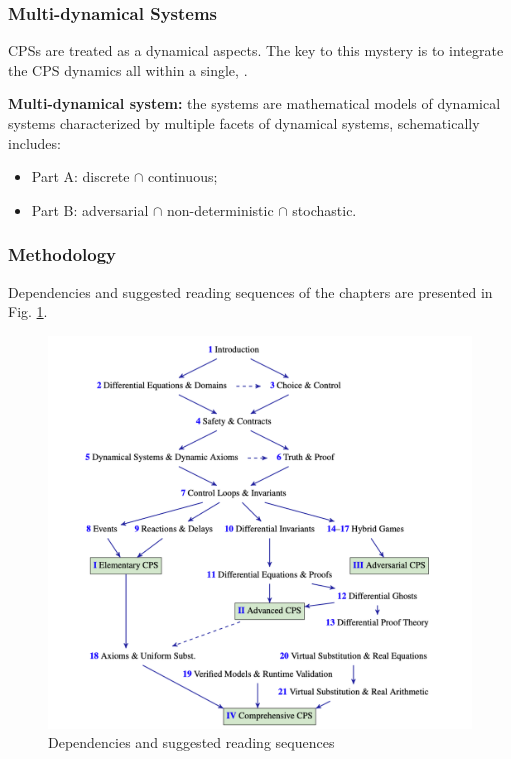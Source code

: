 \subsubsection{Multi-dynamical Systems}

CPSs are treated as a  
dynamical aspects.
The key to this mystery is to integrate the CPS dynamics all within a single,
.

\textbf{Multi-dynamical system:} the systems are mathematical models of 
dynamical systems characterized by multiple facets of dynamical systems, 
schematically includes:
\vspace{-.5cm}
\begin{itemize}
  \item Part A: discrete $\cap$ continuous;
  \item Part B: adversarial $\cap$ non-deterministic $\cap$ stochastic.
\end{itemize}


\subsubsection{Methodology}

Dependencies and suggested reading sequences of the chapters are presented in 
Fig. \ref{fig:socps}.

\begin{figure}[H]
  \centering
  \includegraphics[width=.85\linewidth]
    {notes/hybrid-dynamical-system/figures/structure-of-cps.png}
  \caption{Dependencies and suggested reading sequences}
  \label{fig:socps}
\end{figure}

\crule